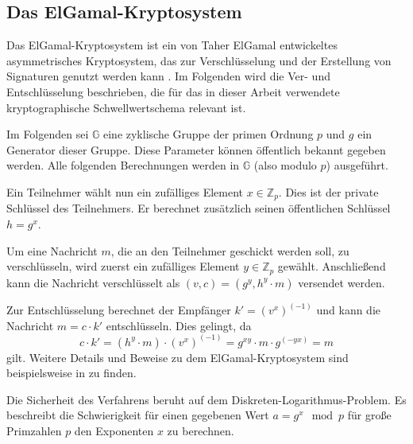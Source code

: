 \subsection{Das ElGamal-Kryptosystem}

\label{sec_basics_threshold_elgamal}

Das ElGamal-Kryptosystem ist ein von Taher ElGamal entwickeltes asymmetrisches Kryptosystem, das zur Verschlüsselung und der Erstellung von Signaturen genutzt werden kann \cite{elgamal1985}. Im Folgenden wird die Ver- und Entschlüsselung beschrieben, die für das in dieser Arbeit verwendete kryptographische Schwellwertschema relevant ist.

Im Folgenden sei \(\mathbb{G}\) eine zyklische Gruppe der primen Ordnung \(p\) und \(g\) ein Generator dieser Gruppe. Diese Parameter können öffentlich bekannt gegeben werden. Alle folgenden Berechnungen werden in \(\mathbb{G}\) (also modulo \(p\)) ausgeführt.

Ein Teilnehmer wählt nun ein zufälliges Element \(x \in \mathbb{Z}_p\). Dies ist der private Schlüssel des Teilnehmers. Er berechnet zusätzlich seinen öffentlichen Schlüssel \(h = g^x\).

Um eine Nachricht \(m\), die an den Teilnehmer geschickt werden soll, zu verschlüsseln, wird zuerst ein zufälliges Element \(y \in \mathbb{Z}_p\) gewählt. Anschließend kann die Nachricht verschlüsselt als \((v, c) = (g^y, h^y \cdot m)\) versendet werden.

Zur Entschlüsselung berechnet der Empfänger \(k' = (v^x)^{(-1)}\) und kann die Nachricht \(m = c \cdot k'\) entschlüsseln. Dies gelingt, da 
\[c \cdot k' = (h^y \cdot m) \cdot (v^x)^{(-1)} = g^{xy} \cdot m \cdot g^{(-yx)} = m\]
gilt. Weitere Details und Beweise zu dem ElGamal-Kryptosystem sind beispielsweise in \cite{katz2014} zu finden.

Die Sicherheit des Verfahrens beruht auf dem Diskreten-Logarithmus-Problem. Es beschreibt die Schwierigkeit für einen gegebenen Wert \(a = g^x \mod p\) für große Primzahlen \(p\) den Exponenten \(x\) zu berechnen.
